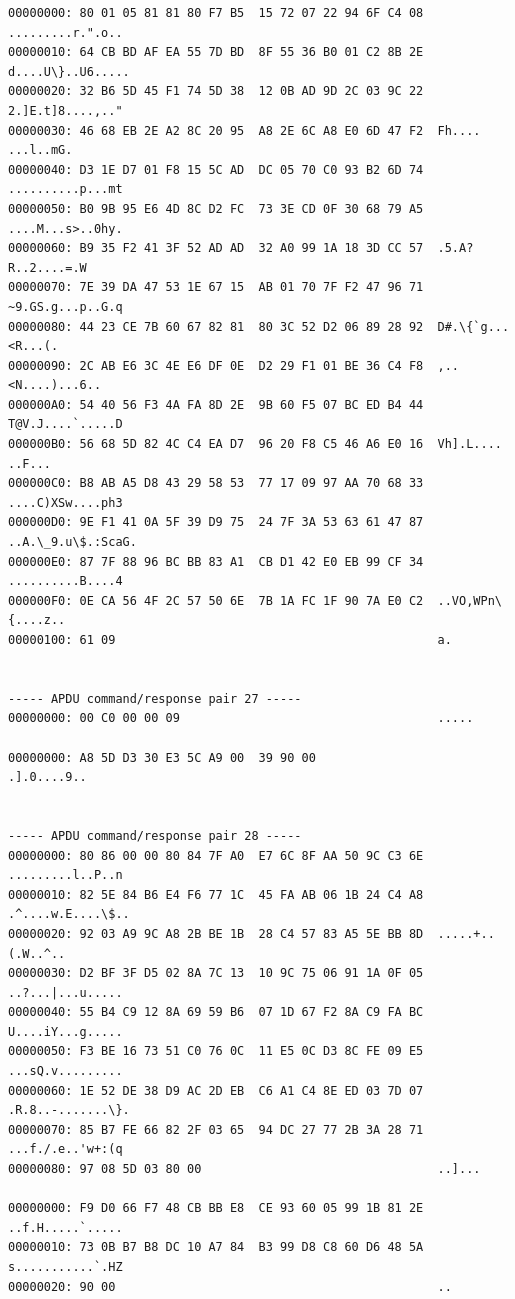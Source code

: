 \documentclass[bsc,frontabs,twoside,singlespacing,parskip,deptreport]{infthesis}     %
\begin{document}
\begin{appendices}
\begin{Verbatim}[commandchars=\\\{\}, fontsize=\small]
00000000: 80 01 05 81 81 80 F7 B5  15 72 07 22 94 6F C4 08  .........r.".o..
00000010: 64 CB BD AF EA 55 7D BD  8F 55 36 B0 01 C2 8B 2E  d....U\}..U6.....
00000020: 32 B6 5D 45 F1 74 5D 38  12 0B AD 9D 2C 03 9C 22  2.]E.t]8....,.."
00000030: 46 68 EB 2E A2 8C 20 95  A8 2E 6C A8 E0 6D 47 F2  Fh.... ...l..mG.
00000040: D3 1E D7 01 F8 15 5C AD  DC 05 70 C0 93 B2 6D 74  ..........p...mt
00000050: B0 9B 95 E6 4D 8C D2 FC  73 3E CD 0F 30 68 79 A5  ....M...s>..0hy.
00000060: B9 35 F2 41 3F 52 AD AD  32 A0 99 1A 18 3D CC 57  .5.A?R..2....=.W
00000070: 7E 39 DA 47 53 1E 67 15  AB 01 70 7F F2 47 96 71  ~9.GS.g...p..G.q
00000080: 44 23 CE 7B 60 67 82 81  80 3C 52 D2 06 89 28 92  D#.\{`g...<R...(.
00000090: 2C AB E6 3C 4E E6 DF 0E  D2 29 F1 01 BE 36 C4 F8  ,..<N....)...6..
000000A0: 54 40 56 F3 4A FA 8D 2E  9B 60 F5 07 BC ED B4 44  T@V.J....`.....D
000000B0: 56 68 5D 82 4C C4 EA D7  96 20 F8 C5 46 A6 E0 16  Vh].L.... ..F...
000000C0: B8 AB A5 D8 43 29 58 53  77 17 09 97 AA 70 68 33  ....C)XSw....ph3
000000D0: 9E F1 41 0A 5F 39 D9 75  24 7F 3A 53 63 61 47 87  ..A.\_9.u\$.:ScaG.
000000E0: 87 7F 88 96 BC BB 83 A1  CB D1 42 E0 EB 99 CF 34  ..........B....4
000000F0: 0E CA 56 4F 2C 57 50 6E  7B 1A FC 1F 90 7A E0 C2  ..VO,WPn\{....z..
00000100: 61 09                                             a.


----- APDU command/response pair 27 -----
00000000: 00 C0 00 00 09                                    .....

00000000: A8 5D D3 30 E3 5C A9 00  39 90 00                 .].0....9..


----- APDU command/response pair 28 -----
00000000: 80 86 00 00 80 84 7F A0  E7 6C 8F AA 50 9C C3 6E  .........l..P..n
00000010: 82 5E 84 B6 E4 F6 77 1C  45 FA AB 06 1B 24 C4 A8  .^....w.E....\$..
00000020: 92 03 A9 9C A8 2B BE 1B  28 C4 57 83 A5 5E BB 8D  .....+..(.W..^..
00000030: D2 BF 3F D5 02 8A 7C 13  10 9C 75 06 91 1A 0F 05  ..?...|...u.....
00000040: 55 B4 C9 12 8A 69 59 B6  07 1D 67 F2 8A C9 FA BC  U....iY...g.....
00000050: F3 BE 16 73 51 C0 76 0C  11 E5 0C D3 8C FE 09 E5  ...sQ.v.........
00000060: 1E 52 DE 38 D9 AC 2D EB  C6 A1 C4 8E ED 03 7D 07  .R.8..-.......\}.
00000070: 85 B7 FE 66 82 2F 03 65  94 DC 27 77 2B 3A 28 71  ...f./.e..'w+:(q
00000080: 97 08 5D 03 80 00                                 ..]...

00000000: F9 D0 66 F7 48 CB BB E8  CE 93 60 05 99 1B 81 2E  ..f.H.....`.....
00000010: 73 0B B7 B8 DC 10 A7 84  B3 99 D8 C8 60 D6 48 5A  s...........`.HZ
00000020: 90 00                                             ..



\end{Verbatim}
\end{appendices}
\end{document}
